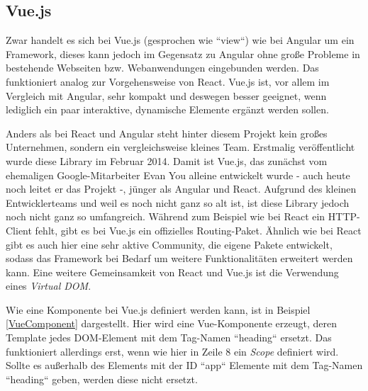 \subsection{Vue.js}
\label{sec:technologies:frameworks:view}

Zwar handelt es sich bei Vue.js (gesprochen wie ``view``) wie bei Angular um ein Framework, dieses kann jedoch im Gegensatz zu Angular ohne große Probleme in bestehende Webseiten bzw. Webanwendungen eingebunden werden. Das funktioniert analog zur Vorgehensweise von React.
Vue.js ist, vor allem im Vergleich mit Angular, sehr kompakt und deswegen besser geeignet, wenn lediglich ein paar interaktive, dynamische Elemente ergänzt werden sollen.

Anders als bei React und Angular steht hinter diesem Projekt kein großes Unternehmen, sondern ein vergleichsweise kleines Team. Erstmalig veröffentlicht wurde diese Library im Februar 2014\cite{Vue}. Damit ist Vue.js, das zunächst vom ehemaligen Google-Mitarbeiter Evan You alleine entwickelt wurde - auch heute noch leitet er das Projekt -, jünger als Angular und React. Aufgrund des kleinen Entwicklerteams und weil es noch nicht ganz so alt ist, ist diese Library jedoch noch nicht ganz so umfangreich. Während zum Beispiel wie bei React ein HTTP-Client fehlt, gibt es bei Vue.js ein offizielles Routing-Paket. Ähnlich wie bei React gibt es auch hier eine sehr aktive Community, die eigene Pakete entwickelt, sodass das Framework bei Bedarf um weitere Funktionalitäten erweitert werden kann. Eine weitere Gemeinsamkeit von React und Vue.js ist die Verwendung eines \textit{Virtual \acs{DOM}}.

Wie eine Komponente bei Vue.js definiert werden kann, ist in Beispiel \ref{VueComponent} dargestellt\cite{VueComponent}. Hier wird eine Vue-Komponente erzeugt, deren Template jedes \acs{DOM}-Element mit dem Tag-Namen ``heading`` ersetzt. Das funktioniert allerdings erst, wenn wie hier in Zeile 8 ein \textit{Scope} definiert wird. Sollte es außerhalb des Elements mit der ID ``app`` Elemente mit dem Tag-Namen ``heading`` geben, werden diese nicht ersetzt.

